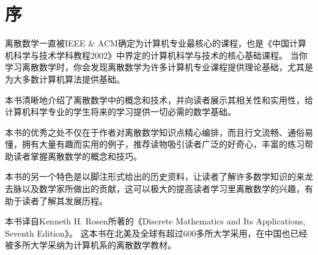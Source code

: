 \chapter{序}
{
    离散数学一直被IEEE \& ACM确定为计算机专业最核心的课程，也是《中国计算机科学与技术学科教程2002》中界定的计算机科学与技术的核心基础课程。
    当你学习离散数学时，你会发现离散数学为许多计算机专业课程提供理论基础，尤其是为大多数计算机算法提供基础。

    本书清晰地介绍了离散数学中的概念和技术，并向读者展示其相关性和实用性，给计算机科学专业的学生将来的学习提供一切必需的数学基础。

    本书的优秀之处不仅在于作者对离散数学知识点精心编排，而且行文流畅、通俗易懂，拥有大量有趣而实用的例子，推荐读物吸引读者广泛的好奇心，丰富的练习帮助读者掌握离散数学的概念和技巧。

    本书的另一个特色是以脚注形式给出的历史资料，让读者了解许多数学知识的来龙去脉以及数学家所做出的贡献，这可以极大的提高读者学习里离散数学的兴趣，有助于读者了解其发展历程。

    本书译自Kenneth H. Rosen所著的《Discrete Mathematics and Its Applications, Seventh Edition》。
    这本书在北美及全球有超过600多所大学采用，在中国也已经被多所大学采纳为计算机系的离散数学教材。
}

\cleardoublepage

\endinput
